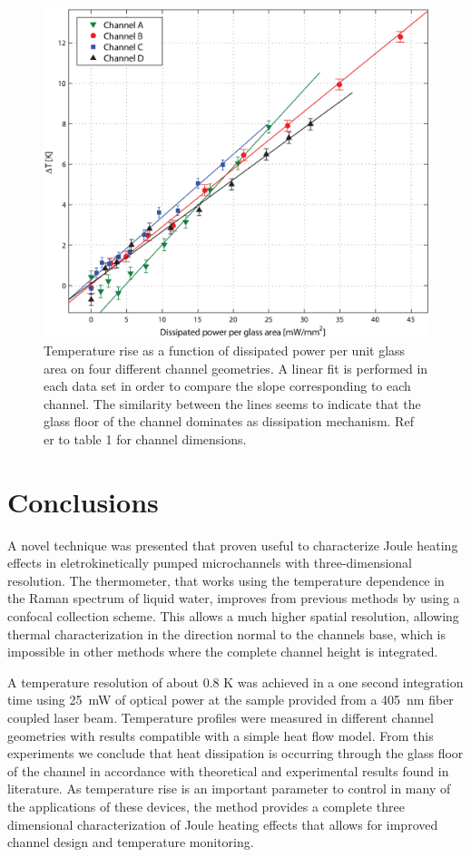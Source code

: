\documentclass[twocolumn]{svjour3}       %
\begin{document}
\begin{figure}[h!]
\centering
\includegraphics[width=\columnwidth]{figs/rectas.eps}
\caption{Temperature rise as a function of dissipated power per unit glass area on four different channel geometries. A linear fit is performed in each data set in order to compare the slope corresponding to each channel. The similarity between the lines seems to indicate that the glass floor of the channel dominates as dissipation mechanism. Ref er to table 1 for channel dimensions.\label{fig:rectas}}
\end{figure}

\section{Conclusions}

A novel technique was presented that proven useful to characterize Joule heating effects in eletrokinetically pumped microchannels with three-dimensional resolution. The thermometer, that works using the temperature dependence in the Raman spectrum of liquid water, improves from previous methods by using a confocal collection scheme. This allows a much higher spatial resolution, allowing thermal characterization in the direction normal to the channels base, which is impossible in other methods where the complete channel height is integrated.

 A temperature resolution of about 0.8 K was achieved in a one second integration time using 25~mW of optical power at the sample provided from a 405~nm fiber coupled laser beam. Temperature profiles were measured in different channel geometries with results compatible with a simple heat flow model. From this experiments we conclude that heat dissipation is occurring through the glass floor of the channel in accordance with theoretical and experimental results found in literature. As temperature rise is an important parameter to control in many of the applications of these devices, the method provides a complete three dimensional characterization of Joule heating effects that allows for improved channel design and temperature monitoring.
\end{document}
